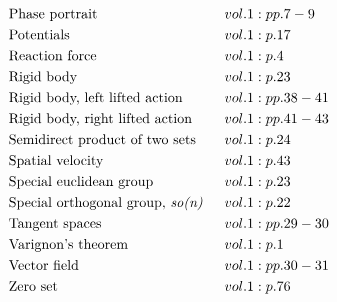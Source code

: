 \documentclass[a4paper]{article}
\begin{document}
\begin{align*}
&\text{Phase portrait} \hspace{0.55556em}&& vol. 1: pp. 7-9\\
&\text{Potentials} \hspace{0.55556em}&& vol. 1: p. 17\\
&\text{Reaction force} \hspace{0.55556em}&& vol. 1: p. 4\\
&\text{Rigid body} \hspace{0.55556em}&& vol. 1: p. 23\\
&\text{Rigid body, left lifted action} \hspace{0.55556em}&& vol. 1: pp. 38-41\\
&\text{Rigid body, right lifted action} \hspace{0.55556em}&& vol. 1: pp. 41-43\\
&\text{Semidirect product of two sets} \hspace{0.55556em}&& vol. 1: p. 24\\
&\text{Spatial velocity} \hspace{0.55556em}&& vol. 1: p. 43\\
&\text{Special euclidean group} \hspace{0.55556em}&& vol. 1: p. 23\\
&\text{Special orthogonal group, \emph{so(n)}} \hspace{0.55556em}&& vol. 1: p. 22\\
&\text{Tangent spaces} \hspace{0.55556em}&& vol. 1: pp. 29-30\\
&\text{Varignon's theorem} \hspace{0.55556em}&& vol. 1: p. 1\\
&\text{Vector field} \hspace{0.55556em}&& vol. 1: pp. 30-31\\
&\text{Zero set} \hspace{0.55556em}&& vol. 1: p. 76\\
\end{align*} 
\end{document}
